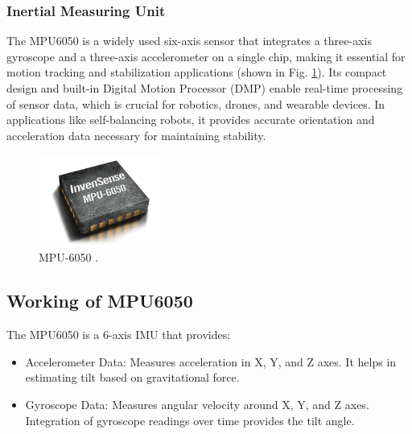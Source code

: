 \subsubsection{Inertial Measuring Unit}
The MPU6050 is a widely used six-axis sensor that integrates a three-axis gyroscope and a three-axis accelerometer on a single chip, making it essential for motion tracking and stabilization applications (shown in Fig. \ref{fig:mpu-6050}). Its compact design and built-in Digital Motion Processor (DMP) enable real-time processing of sensor data, which is crucial for robotics, drones, and wearable devices.
In applications like self-balancing robots, it provides accurate orientation and acceleration data necessary for maintaining stability. 

\begin{figure}[H]
	\centering
	\includegraphics[height=3cm]{assets/mpu-6050.png}
	\caption{MPU-6050 \cite{mpu6050}.}
	\label{fig:mpu-6050}
\end{figure}


\subsection{Working of MPU6050}
The MPU6050 is a 6-axis IMU that provides:
\begin{itemize}
	\item Accelerometer Data: Measures acceleration in X, Y, and Z axes. It helps in estimating tilt based on gravitational force.
	\item Gyroscope Data: Measures angular velocity around X, Y, and Z axes. Integration of gyroscope readings over time provides the tilt angle.
\end{itemize}

